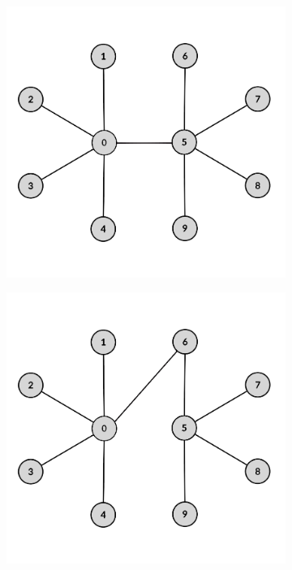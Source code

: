 \begin{figure}[t]
	\centering
	\begin{subfigure}[t]{0.3\textwidth}
		\centering
		\includegraphics[height=0.15\textheight]{Figures/starB}
		\caption{}
		\label{subfig:starB}
	\end{subfigure}
	\hfill
	\begin{subfigure}[t]{0.3\textwidth}
		\centering
		\includegraphics[height=0.15\textheight]{Figures/starC}

\end{subfigure}
\end{figure}
